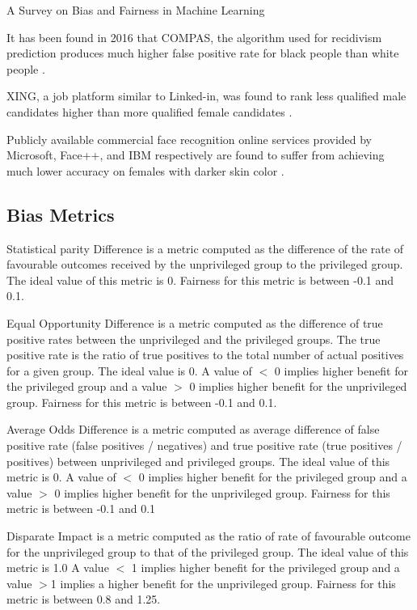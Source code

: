 \documentclass[final,5p,times,twocolumn]{elsarticle}
\begin{document}
A Survey on Bias and Fairness in Machine Learning

It has been found in 2016 that COMPAS, the algorithm used for recidivism prediction produces much higher false positive rate for black people than white people \cite{angwin2016machine}.

XING, a job platform similar to Linked-in, was found to rank less qualified male candidates higher than more qualified female candidates \cite{lahoti2019ifair}.

Publicly available commercial face recognition online services provided by Microsoft, Face++, and IBM respectively are found to suffer from achieving much lower accuracy on females with darker skin color \cite{buolamwini2018gender}.

\subsection{Bias Metrics}
\label{sec:bias_metrics}



Statistical parity Difference \cite{dwork2012fairness,bellamy2018ai} is a metric computed as the difference of the rate of favourable outcomes received by the unprivileged group to the privileged group. The ideal value of this metric is 0. Fairness for this metric is between -0.1 and 0.1.

Equal Opportunity Difference \cite{bellamy2018ai} is a metric computed as the difference of true positive rates between the unprivileged and the privileged groups. 
The true positive rate is the ratio of true positives to the total number of actual positives for a given group. The ideal value is 0. A value of $<$ 0 implies higher benefit for the privileged group and a value $>$ 0 implies higher benefit for the unprivileged group. Fairness for this metric is between -0.1 and 0.1.

Average Odds Difference \cite{bellamy2018ai} is a metric computed as average difference of false positive rate (false positives / negatives) and true positive rate (true positives / positives) between unprivileged and privileged groups.
The ideal value of this metric is 0. A value of $<$ 0 implies higher benefit for the privileged group and a value $>$ 0 implies higher benefit for the unprivileged group.
Fairness for this metric is between -0.1 and 0.1

Disparate Impact \cite{feldman2015disparate,bellamy2018ai} is a metric computed as the ratio of rate of favourable outcome for the unprivileged group to that of the privileged group.
The ideal value of this metric is 1.0 A value $<$ 1 implies higher benefit for the privileged group and a value $>$1 implies a higher benefit for the unprivileged group.
Fairness for this metric is between 0.8 and 1.25.
\end{document}
